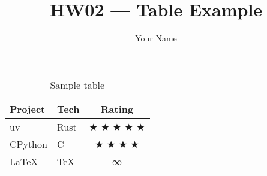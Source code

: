 \documentclass{article}
\title{HW02 — Table Example}
\author{Your Name}
\begin{document}
\maketitle
\begin{table}[htbp]
\centering
\begin{tabular}{llc}
Project & Tech & Rating \\ \hline
uv & Rust & ★ ★ ★ ★ ★ \\
CPython & C & ★ ★ ★ ★ \\
LaTeX & TeX & ∞ \\
\end{tabular}
\caption{Sample table}
\label{tab:sample}
\end{table}
\end{document}
